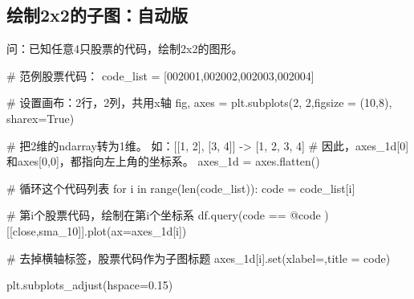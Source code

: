 \documentclass[
  letterpaper,
  DIV=11,
  numbers=noendperiod]{scrreprt}
\newenvironment{Shaded}{\begin{snugshade}}{\end{snugshade}}
\newcommand{\BuiltInTok}[1]{\textcolor[rgb]{0.00,0.23,0.31}{#1}}
\newcommand{\CommentTok}[1]{\textcolor[rgb]{0.37,0.37,0.37}{#1}}
\newcommand{\ControlFlowTok}[1]{\textcolor[rgb]{0.00,0.23,0.31}{#1}}
\newcommand{\DecValTok}[1]{\textcolor[rgb]{0.68,0.00,0.00}{#1}}
\newcommand{\FloatTok}[1]{\textcolor[rgb]{0.68,0.00,0.00}{#1}}
\newcommand{\KeywordTok}[1]{\textcolor[rgb]{0.00,0.23,0.31}{#1}}
\newcommand{\NormalTok}[1]{\textcolor[rgb]{0.00,0.23,0.31}{#1}}
\newcommand{\OperatorTok}[1]{\textcolor[rgb]{0.37,0.37,0.37}{#1}}
\newcommand{\StringTok}[1]{\textcolor[rgb]{0.13,0.47,0.30}{#1}}
\newcommand{\VariableTok}[1]{\textcolor[rgb]{0.07,0.07,0.07}{#1}}
\begin{document}
\hypertarget{ux7ed8ux52362x2ux7684ux5b50ux56feux81eaux52a8ux7248}{%
\subsection{绘制2x2的子图：自动版}\label{ux7ed8ux52362x2ux7684ux5b50ux56feux81eaux52a8ux7248}}

问：已知任意4只股票的代码，绘制2x2的图形。

\begin{Shaded}
\begin{Highlighting}[]
\CommentTok{\# 范例股票代码：}
\NormalTok{code\_list }\OperatorTok{=}\NormalTok{ [}\StringTok{\textquotesingle{}002001\textquotesingle{}}\NormalTok{,}\StringTok{\textquotesingle{}002002\textquotesingle{}}\NormalTok{,}\StringTok{\textquotesingle{}002003\textquotesingle{}}\NormalTok{,}\StringTok{\textquotesingle{}002004\textquotesingle{}}\NormalTok{]}

\CommentTok{\# 设置画布：2行，2列，共用x轴}
\NormalTok{fig, axes }\OperatorTok{=}\NormalTok{ plt.subplots(}\DecValTok{2}\NormalTok{, }\DecValTok{2}\NormalTok{,figsize }\OperatorTok{=}\NormalTok{ (}\DecValTok{10}\NormalTok{,}\DecValTok{8}\NormalTok{), sharex}\OperatorTok{=}\VariableTok{True}\NormalTok{)}

\CommentTok{\# 把2维的ndarray转为1维。 如：[[1, 2], [3, 4]] {-}\textgreater{} [1, 2, 3, 4]}
\CommentTok{\# 因此，axes\_1d[0]和axes[0,0]，都指向左上角的坐标系。}
\NormalTok{axes\_1d }\OperatorTok{=}\NormalTok{ axes.flatten() }

\CommentTok{\# 循环这个代码列表}
\ControlFlowTok{for}\NormalTok{ i }\KeywordTok{in} \BuiltInTok{range}\NormalTok{(}\BuiltInTok{len}\NormalTok{(code\_list)):}
\NormalTok{    code }\OperatorTok{=}\NormalTok{ code\_list[i]}

    \CommentTok{\# 第i个股票代码，绘制在第i个坐标系}
\NormalTok{    df.query(}\StringTok{\textquotesingle{}code == @code \textquotesingle{}}\NormalTok{)[[}\StringTok{\textquotesingle{}close\textquotesingle{}}\NormalTok{,}\StringTok{\textquotesingle{}sma\_10\textquotesingle{}}\NormalTok{]].plot(ax}\OperatorTok{=}\NormalTok{axes\_1d[i])}

    \CommentTok{\# 去掉横轴标签，股票代码作为子图标题}
\NormalTok{    axes\_1d[i].}\BuiltInTok{set}\NormalTok{(xlabel}\OperatorTok{=}\StringTok{\textquotesingle{}\textquotesingle{}}\NormalTok{,title }\OperatorTok{=}\NormalTok{ code)}

\NormalTok{plt.subplots\_adjust(hspace}\OperatorTok{=}\FloatTok{0.15}\NormalTok{)}
\end{Highlighting}
\end{Shaded}
\end{document}
